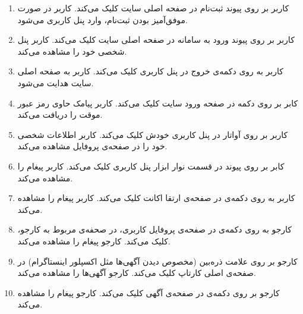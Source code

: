\begin{enumerate}
	\item[]  			
	
	\tuc				
	{کاربر بر روی پیوند ثبت‌نام در صفحه اصلی سایت کلیک می‌کند.}				
	{کاربر در صورت موفق‌آمیز بودن ثبت‌نام، وارد پنل کاربری می‌شود.}
	
	\item[]  			
	\tuc				
	{کاربر بر روی پیوند ورود به سامانه در صفحه اصلی سایت کلیک می‌کند.}				
	{کاربر پنل شخصی خود را مشاهده می‌کند.}
	
	\item[] 
	\tuc				
	{کاربر به روی دکمه‌ی خروج در پنل کاربری کلیک می‌کند.}				
	{کاربر به صفحه اصلی سایت هدایت می‌شود.}
	
	\item[] 
	\tuc				
	{کابر بر روی دکمه  در صفحه ورود سایت کلیک می‌کند.}				
	{کاربر پیامک حاوی رمز عبور موقت را دریافت می‌کند.}
	
	\item[] 
	\tuc				
	{کاربر بر روی آواتار در پنل کاربری خودش کلیک می‌کند.}				
	{کاربر اطلاعات شخصی خود را در صفحه‌ی پروفایل مشاهده می‌کند.}
	
	\item[] 
	\tuc				
	{کابر بر روی پیوند  در قسمت نوار ابزار پنل کاربری کلیک می‌کند.}	
	{کاربر پیغام  را مشاهده می‌کند.}
	
	\item[] 
	\tuc				
	{کاربر به روی دکمه‌ی  در صفحه‌ی ارتقا اکانت کلیک می‌کند.}
	{کاربر پیغام  را مشاهده می‌کند.}
	
	\item[] 
	\tuc				
	{کارجو به روی دکمه‌ی  در صفحه‌ی پروفایل کاربری، در صحفه‌ی مربوط به کارجو، کلیک می‌کند.}
	{کارجو پیغام  را مشاهده می‌کند.}
	
	\item[] 
	\tuc				
	{کارجو بر روی علامت ذره‌بین (مخصوص دیدن آگهی‌ها مثل اکسپلور اینستاگرام) در صفحه‌ی اصلی کارتاپ کلیک می‌کند.}
	{کارجو آگهی‌ها را مشاهده می‌کند.}
	
	\item[] 
	\tuc				
	{کارجو بر روی دکمه‌ی  در صفحه‌ی آگهی کلیک می‌کند.}				
	{کارجو پیغام  را مشاهده می‌کند.}
	

\end{enumerate}
